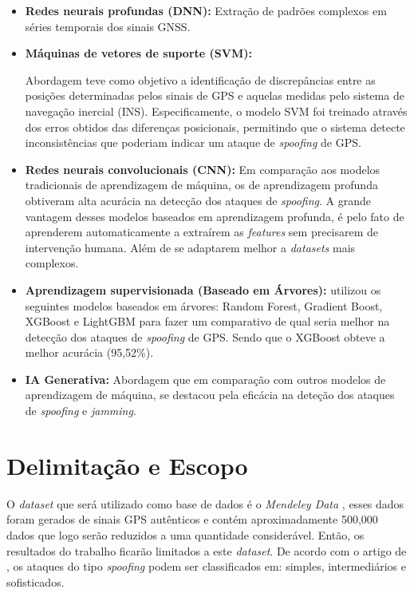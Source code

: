 \documentclass[12pt]{article}
\begin{document}
\begin{itemize}
    \item \textbf{Redes neurais profundas (DNN):}
     Extração de padrões complexos em séries temporais dos sinais GNSS.
     \cite{isleyenGPSSpoofingDetection2024}

    \item \textbf{Máquinas de vetores de suporte (SVM):}

     Abordagem teve como objetivo a identificação
     de discrepâncias entre as posições determinadas pelos sinais de GPS
     e aquelas medidas pelo sistema de navegação inercial (INS).
     Especificamente, o modelo SVM foi treinado através dos erros obtidos
     das diferenças posicionais,
     permitindo que o sistema detecte inconsistências que poderiam
     indicar um ataque de \textit{spoofing} de GPS.
     \cite{panice2017}
    
    \item \textbf{Redes neurais convolucionais (CNN):} Em comparação
    aos modelos tradicionais de aprendizagem de máquina,
    os de aprendizagem profunda obtiveram alta acurácia na detecção dos
    ataques de \textit{spoofing}.
    A grande vantagem desses modelos baseados em aprendizagem profunda,
    é pelo fato de aprenderem automaticamente a extraírem as \textit{features}
    sem precisarem de intervenção humana. Além de se adaptarem melhor
    a \textit{datasets} mais complexos. \cite{cnn2023}

    
    \item \textbf{Aprendizagem supervisionada (Baseado em Árvores):}
    \textcite{Aissou2021} utilizou os seguintes modelos baseados
     em árvores: Random Forest, Gradient Boost, XGBoost e LightGBM
     para fazer um comparativo de qual seria melhor na detecção dos ataques
     de \textit{spoofing} de GPS.
     Sendo que o XGBoost obteve a melhor acurácia (95,52\%).

    \item \textbf{IA Generativa:}  Abordagem que em comparação com outros
    modelos de aprendizagem de máquina, se destacou pela eficácia
    na deteção dos ataques de \textit{spoofing} e \textit{jamming}.
    \cite{elalamiDroneDefGANtGenerativeAIBased2024}
    
\end{itemize}

\section{Delimitação e Escopo}
O \textit{dataset} que será utilizado como base de dados é o \textit{Mendeley Data} 
\cite{aissou2022dataset}, esses dados foram gerados de sinais GPS autênticos e 
contém aproximadamente 500,000 dados que logo serão reduzidos a uma quantidade
considerável. Então, os resultados do trabalho ficarão
limitados a este \textit{dataset}.
De acordo com o artigo de \cite{Aissou2021}, os ataques do tipo
\textit{spoofing} podem ser classificados em: simples,
intermediários e sofisticados.
\end{document}

